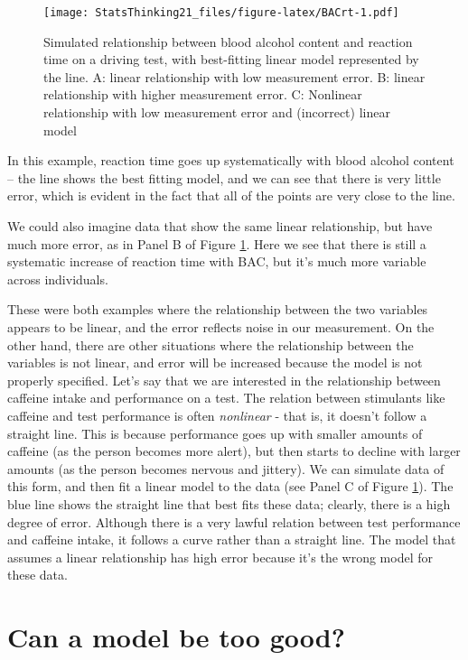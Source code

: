 \documentclass[12pt,]{book}
\theoremstyle{definition}
\theoremstyle{definition}
\theoremstyle{definition}
\theoremstyle{remark}
\begin{document}
\begin{figure}
\centering
\texttt{[image: StatsThinking21\_files/figure-latex/BACrt-1.pdf]}
\caption{\label{fig:BACrt}Simulated relationship between blood alcohol content and reaction time on a driving test, with best-fitting linear model represented by the line. A: linear relationship with low measurement error. B: linear relationship with higher measurement error. C: Nonlinear relationship with low measurement error and (incorrect) linear model}
\end{figure}

In this example, reaction time goes up systematically with blood alcohol content -- the line shows the best fitting model, and we can see that there is very little error, which is evident in the fact that all of the points are very close to the line.

We could also imagine data that show the same linear relationship, but have much more error, as in Panel B of Figure \ref{fig:BACrt}. Here we see that there is still a systematic increase of reaction time with BAC, but it's much more variable across individuals.

These were both examples where the relationship between the two variables appears to be linear, and the error reflects noise in our measurement. On the other hand, there are other situations where the relationship between the variables is not linear, and error will be increased because the model is not properly specified. Let's say that we are interested in the relationship between caffeine intake and performance on a test. The relation between stimulants like caffeine and test performance is often \emph{nonlinear} - that is, it doesn't follow a straight line. This is because performance goes up with smaller amounts of caffeine (as the person becomes more alert), but then starts to decline with larger amounts (as the person becomes nervous and jittery). We can simulate data of this form, and then fit a linear model to the data (see Panel C of Figure \ref{fig:BACrt}). The blue line shows the straight line that best fits these data; clearly, there is a high degree of error. Although there is a very lawful relation between test performance and caffeine intake, it follows a curve rather than a straight line. The model that assumes a linear relationship has high error because it's the wrong model for these data.

\hypertarget{overfitting}{%
\section{Can a model be too good?}\label{overfitting}}
\end{document}
